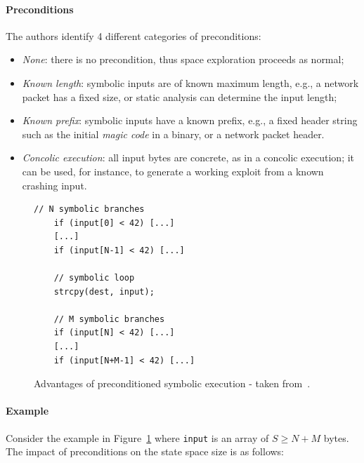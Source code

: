 \paragraph{Preconditions} The authors identify 4 different categories of preconditions:
\begin{itemize}
\item {\em None}: there is no precondition, thus space exploration proceeds as normal;
\item {\em Known length}: symbolic inputs are of known maximum length, e.g., a network packet has a fixed size, or static analysis can determine the input length;
\item {\em Known prefix}: symbolic inputs have a known prefix, e.g., a fixed header string such as the initial {\em magic code} in a binary, or a network packet header.
\item {\em Concolic execution}: all input bytes are concrete, as in a concolic execution; it can be used, for instance, to generate a working exploit from a known crashing input. 
\end{itemize}

\begin{figure}[!ht]
\begin{small}
\begin{lstlisting}[basicstyle=\ttfamily\small]
    // N symbolic branches 
    if (input[0] < 42) [...]
    [...]
    if (input[N-1] < 42) [...]

    // symbolic loop
    strcpy(dest, input); 

    // M symbolic branches
    if (input[N] < 42) [...]
    [...]
    if (input[N+M-1] < 42) [...]
\end{lstlisting}
\end{small}
\caption{\label{fig:preconditioned} Advantages of preconditioned symbolic execution - taken from~\protect\cite{AEG-NDSS11}.}
\end{figure}

\paragraph{Example} Consider the example in Figure~\ref{fig:preconditioned} where {\tt input} is an array of $S\ge N+M$ bytes. The impact of preconditions on the state space size is as follows:


